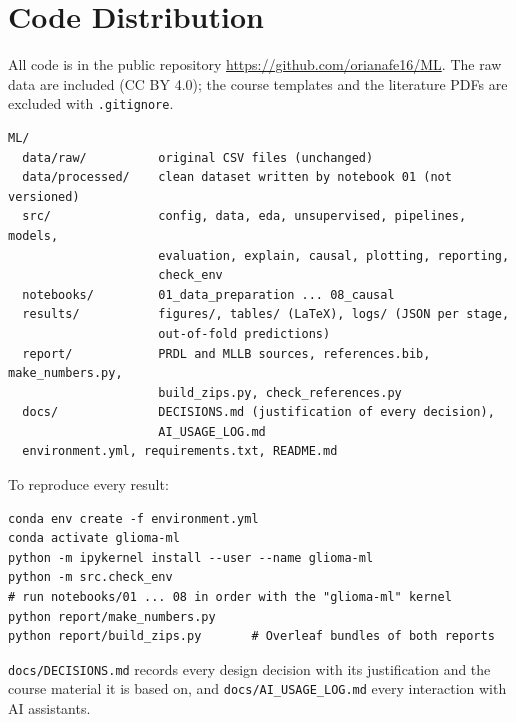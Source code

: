\section{Code Distribution}\label{sec:mllb-code}

All code is in the public repository \url{https://github.com/orianafe16/ML}. The raw data are included
(CC BY 4.0); the course templates and the literature PDFs are excluded with \texttt{.gitignore}.

\begin{lstlisting}[language={}]
ML/
  data/raw/          original CSV files (unchanged)
  data/processed/    clean dataset written by notebook 01 (not versioned)
  src/               config, data, eda, unsupervised, pipelines, models,
                     evaluation, explain, causal, plotting, reporting,
                     check_env
  notebooks/         01_data_preparation ... 08_causal
  results/           figures/, tables/ (LaTeX), logs/ (JSON per stage,
                     out-of-fold predictions)
  report/            PRDL and MLLB sources, references.bib, make_numbers.py,
                     build_zips.py, check_references.py
  docs/              DECISIONS.md (justification of every decision),
                     AI_USAGE_LOG.md
  environment.yml, requirements.txt, README.md
\end{lstlisting}

To reproduce every result:
\begin{lstlisting}[language={}]
conda env create -f environment.yml
conda activate glioma-ml
python -m ipykernel install --user --name glioma-ml
python -m src.check_env
# run notebooks/01 ... 08 in order with the "glioma-ml" kernel
python report/make_numbers.py
python report/build_zips.py       # Overleaf bundles of both reports
\end{lstlisting}

\texttt{docs/\allowbreak{}DECISIONS.\allowbreak{}md} records every design decision with its justification and the course material
it is based on, and \texttt{docs/\allowbreak{}AI\_\allowbreak{}USAGE\_\allowbreak{}LOG.\allowbreak{}md} every interaction with AI assistants.
